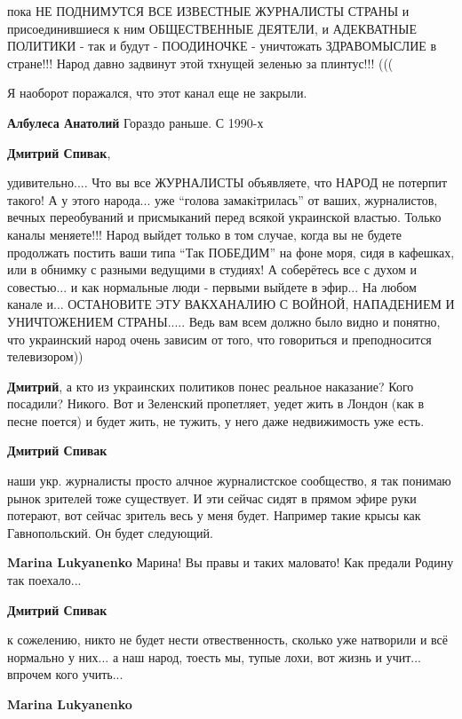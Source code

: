 \begin{itemize}
\begin{itemize}
пока НЕ ПОДНИМУТСЯ ВСЕ ИЗВЕСТНЫЕ ЖУРНАЛИСТЫ СТРАНЫ и присоединившиеся к ним
ОБЩЕСТВЕННЫЕ ДЕЯТЕЛИ, и АДЕКВАТНЫЕ ПОЛИТИКИ - так и будут - ПООДИНОЧКЕ -
уничтожать ЗДРАВОМЫСЛИЕ в стране!!! Народ давно задвинут этой тхнущей зеленью
за плинтус!!! (((

Я наоборот поражался, что этот канал еще не закрыли.

\textbf{Албулеса Анатолий} Гораздо раньше. С 1990-х

\textbf{Дмитрий Спивак}, 

удивительно.... Что вы все ЖУРНАЛИСТЫ объявляете, что НАРОД не потерпит такого!
А у этого народа... уже \enquote{голова замакiтрилась} от ваших, журналистов, вечных
переобуваний и присмыканий перед всякой украинской властью. Только каналы
меняете!!! Народ выйдет только в том случае, когда вы не будете продолжать
постить ваши типа \enquote{Так ПОБЕДИМ} на фоне моря, сидя в кафешках, или в обнимку с
разными ведущими в студиях! А соберётесь все с духом и совестью... и как
нормальные люди - первыми выйдете в эфир... На любом канале и... ОСТАНОВИТЕ ЭТУ
ВАКХАНАЛИЮ С ВОЙНОЙ, НАПАДЕНИЕМ И УНИЧТОЖЕНИЕМ СТРАНЫ..... Ведь вам всем должно
было видно и понятно, что украинский народ очень зависим от того, что
говориться и преподносится телевизором))


\textbf{Дмитрий}, а кто из украинских политиков понес реальное наказание? Кого посадили? Никого. Вот и Зеленский пропетляет, уедет жить в Лондон (как в песне поется) и будет жить, не тужить, у него даже недвижимость уже есть.

\textbf{Дмитрий Спивак} 

наши укр. журналисты просто алчное журналистское сообщество, я так понимаю рынок
зрителей тоже существует. И эти сейчас сидят в прямом эфире руки потерают, вот
сейчас зритель весь у меня будет. Например такие крысы как Гавнопольский. Он
будет следующий.

\textbf{Marina Lukyanenko} Марина! Вы правы и таких маловато! Как предали Родину так поехало...

\textbf{Дмитрий Спивак} 

к сожелению, никто не будет нести отвественность, сколько уже натворили и всё
нормально у них... а наш народ, тоесть мы, тупые лохи, вот жизнь и
учит... впрочем кого учить...

\textbf{Marina Lukyanenko} 


\end{itemize}
\end{itemize}
